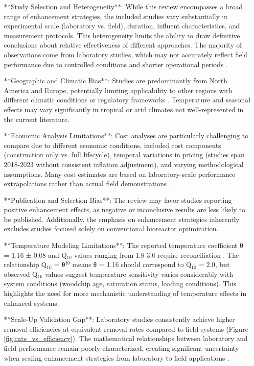 \documentclass[12pt,a4paper]{article}
\begin{document}
**Study Selection and Heterogeneity**: While this review encompasses a broad range of enhancement strategies, the included studies vary substantially in experimental scale (laboratory vs. field), duration, influent characteristics, and measurement protocols. This heterogeneity limits the ability to draw definitive conclusions about relative effectiveness of different approaches. The majority of observations come from laboratory studies, which may not accurately reflect field performance due to controlled conditions and shorter operational periods \citep{RN312}.

**Geographic and Climatic Bias**: Studies are predominantly from North America and Europe, potentially limiting applicability to other regions with different climatic conditions or regulatory frameworks \citep{RN1023, RN258}. Temperature and seasonal effects may vary significantly in tropical or arid climates not well-represented in the current literature.

**Economic Analysis Limitations**: Cost analyses are particularly challenging to compare due to different economic conditions, included cost components (construction only vs. full lifecycle), temporal variations in pricing (studies span 2018-2023 without consistent inflation adjustment), and varying methodological assumptions. Many cost estimates are based on laboratory-scale performance extrapolations rather than actual field demonstrations \citep{RN312}.

**Publication and Selection Bias**: The review may favor studies reporting positive enhancement effects, as negative or inconclusive results are less likely to be published. Additionally, the emphasis on enhancement strategies inherently excludes studies focused solely on conventional bioreactor optimization.

**Temperature Modeling Limitations**: The reported temperature coefficient θ = 1.16 ± 0.08 and Q$_{10}$ values ranging from 1.8-3.0 require reconciliation \citep{RN242, RN228}. The relationship Q$_{10}$ = θ$^{10}$ means θ = 1.16 should correspond to Q$_{10}$ = 2.0, but observed Q$_{10}$ values suggest temperature sensitivity varies considerably with system conditions (woodchip age, saturation status, loading conditions). This highlights the need for more mechanistic understanding of temperature effects in enhanced systems.

**Scale-Up Validation Gap**: Laboratory studies consistently achieve higher removal efficiencies at equivalent removal rates compared to field systems (Figure \ref{fig:rate_vs_efficiency}). The mathematical relationships between laboratory and field performance remain poorly characterized, creating significant uncertainty when scaling enhancement strategies from laboratory to field applications \citep{RN312}.
\end{document}
